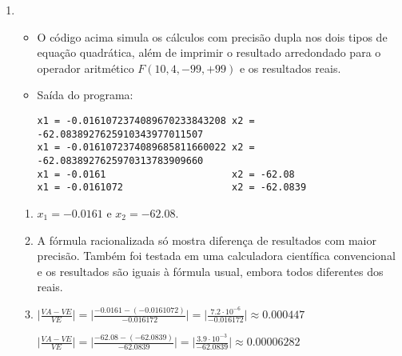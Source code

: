 \documentclass{article}
\newenvironment{arabenum}{
    \begin{enumerate}[label=\textbf{\arabic*})]
}{
    \end{enumerate}
}
\newenvironment{alphenum}{
    \begin{enumerate}[label=(\alph*)]
}{
    \end{enumerate}
}
\newenvironment{discusscode}[1]{
    
    \vspace{-2mm}
    \begin{itemize}
}{
    \end{itemize}
}
\begin{document}
\begin{arabenum}
\begin{discusscode}{div_by_zero.py}
\begin{verbatim}
-0.0000000000000001110223024625156540423631668090820312500
-0.0000000000000001110223024625156540423631668090820312500

1.0000000000000000000000000000000000000000000000000000000
1.0000000000000000000000000000000000000000000000000000000\end{verbatim}

\end{discusscode}

\item \begin{discusscode}{quadratic.py}

\item O código acima simula os cálculos com precisão dupla nos dois tipos de
equação quadrática, além de imprimir o resultado arredondado para o operador
aritmético $F(10, 4, -99, +99)$ e os resultados reais.

\item Saída do programa:

\begin{verbatim}
x1 = -0.0161072374089670233843208 x2 = -62.0838927625910343977011507
x1 = -0.0161072374089685811660022 x2 = -62.0838927625970313783909660
x1 = -0.0161                      x2 = -62.08
x1 = -0.0161072                   x2 = -62.0839
\end{verbatim}

\end{discusscode}

\begin{alphenum}

\item $x_1 = \boldsymbol{-0.0161}$ e $x_2 = \boldsymbol{-62.08}$.

\item A fórmula racionalizada só mostra diferença de resultados com maior
precisão. Também foi testada em uma calculadora científica convencional e os
resultados são iguais à fórmula usual, embora todos diferentes dos reais.

\item $\big\vert\frac{VA - VE}{VE}\big\vert
= \big\vert\frac{-0.0161 - (-0.0161072)}{-0.016172}\big\vert
= \big\vert\frac{7.2 \cdot 10^{-6}}{-0.016172}\big\vert
\approx \boldsymbol{0.000447}$

$\big\vert\frac{VA - VE}{VE}\big\vert
= \big\vert\frac{-62.08 - (-62.0839)}{-62.0839}\big\vert
= \big\vert\frac{3.9 \cdot 10^{-3}}{-62.0839}\big\vert
\approx \boldsymbol{0.00006282}$

\end{alphenum}


\end{arabenum}
\end{document}
